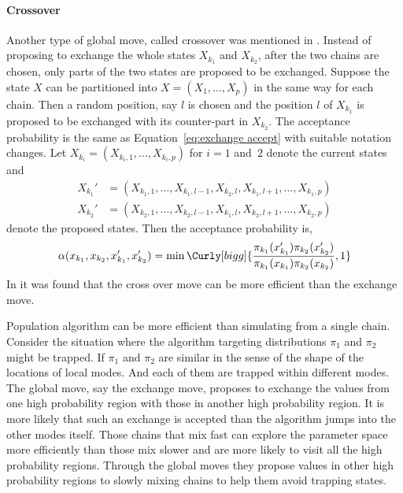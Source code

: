 \paragraph{Crossover}

Another type of global move, called crossover was mentioned in
\cite{Liang:2001dc}. Instead of proposing to exchange the whole states
$X_{k_1}$ and $X_{k_2}$, after the two chains are chosen, only parts of the
two states are proposed to be exchanged. Suppose the state $X$ can be
partitioned into $X = (X_1,\dots,X_p)$ in the same way for each chain. Then a
random position, say $l$ is chosen and the position $l$ of $X_{k_1}$ is
proposed to be exchanged with its counter-part in $X_{k_2}$. The acceptance
probability is the same as Equation~\eqref{eq:exchange accept} with suitable
notation changes. Let $X_{k_i} = (X_{k_i,1},\dots,X_{k_i,p})$ for $i = 1$
and~$2$ denote the current states and
\begin{align*}
  X_{k_1}' &= (X_{k_1,1},\dots,X_{k_1,l-1},
  X_{k_2,l},X_{k_1,l+1},\dots,X_{k_1,p}) \\
  X_{k_2}' &= (X_{k_2,1},\dots,X_{k_2,l-1},
  X_{k_1,l},X_{k_2,l+1},\dots,X_{k_2,p})
\end{align*}
denote the proposed states. Then the acceptance probability is,
\begin{equation}
  \alpha(x_{k_1},x_{k_2},x_{k_1}',x_{k_2}') = \min\Curly[bigg]
  {\frac{\pi_{k_1}(x_{k_1}')\pi_{k_2}(x_{k_2}')}
  {\pi_{k_1}(x_{k_1})\pi_{k_2}(x_{k_2})},1}
  \label{eq:cross accept}
\end{equation}
In \cite{Jasra:2007in} it was found that the cross over move can be more
efficient than the exchange move.

Population \mcmc algorithm can be more efficient than simulating from a
single chain. Consider the situation where the \mcmc algorithm targeting
distributions $\pi_1$ and $\pi_2$ might be trapped. If $\pi_1$ and $\pi_2$
are similar in the sense of the shape of the locations of local modes. And
each of them are trapped within different modes. The global move, say the
exchange move, proposes to exchange the values from one high probability
region with those in another high probability region. It is more likely that
such an exchange is accepted than the \mcmc algorithm jumps into the other
modes itself. Those chains that mix fast can explore the parameter space more
efficiently than those mix slower and are more likely to visit all the high
probability regions. Through the global moves they propose values in other
high probability regions to slowly mixing chains to help them avoid
trapping states.

